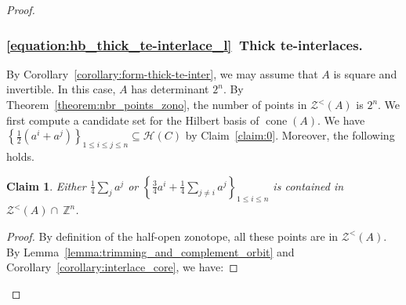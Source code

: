 \documentclass[11pt,a4paper]{amsart}
\renewcommand*{\leq}{\leqslant}
\theoremstyle{plain}
\newtheorem*{claimproof}{Proof of the claim}{\itshape}{\rmfamily}
\newtheorem{claimnumb}{Claim}[theorem]{\itshape}{\rmfamily}
\theoremstyle{definition}
\newcommand{\cal}[1]{\mathcal{#1}}
\newcommand{\Z}{\mathbb{Z}}
\DeclareMathOperator{\cone}{cone}
\DeclareMathOperator{\gcddet}{gcddet}
\renewcommand{\cal}[1]{\mathcal{#1}}
\begin{document}
\begin{proof}
\subsubsection*{\ref{equation:hb_thick_te-interlace_l}~Thick te-interlaces.}	
By Corollary~\ref{corollary:form-thick-te-inter}, we may assume that $A$ is square and invertible.
In this case, $A$ has determinant $2^{n}$.
By Theorem~\ref{theorem:nbr_points_zono}, the number of points in $\cal Z^<(A)$ is $2^{n}$.
We first compute a candidate set for the Hilbert basis of $\cone(A)$.
We have $\left\{\frac{1}{2} (a^i + a^j)\right\}_{1\leq i\leq j\leq n} \subseteq \cal H(C)$ by Claim~\ref{claim:0}. Moreover, the following holds.
\begin{claimnumb}\label{claim:3.5}
Either $\frac{1}{4}\sum_{j} a^j$ or $\left\{\frac{3}{4}a^i+\frac{1}{4}\sum_{j\neq i} a^j\right\}_{1\leq i\leq n}$ is contained in $\cal{Z}^<(A)\cap~\Z^n$.
\end{claimnumb}
\begin{proof}
By definition of the half-open zonotope, all these points are in $\cal{Z}^<(A)$.
By Lemma~\ref{lemma:trimming_and_complement_orbit} and Corollary~\ref{corollary:interlace_core}, we have:

\end{proof}
\end{proof}
\end{document}
